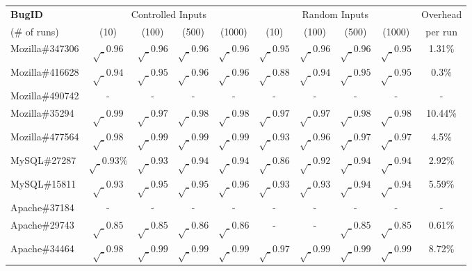 \begin{table}[h!]
  \centering
  \scriptsize
  \newcommand{\Yes}[1]{\checkmark{}$_#1$}
  \newcommand{\No}[0]{-}
  \begin{tabular}{lccccccccc}
    \toprule     
   {\bf BugID}                   &  \multicolumn{4}{c}{Controlled Inputs}            &     \multicolumn{4}{c}{Random Inputs}          & Overhead \\
                           
    \cmidrule(lr){2-5}
    \cmidrule(lr){6-9}
    (\# of runs)                 &  (10)     &   (100)    &    (500)    & (1000)     &  (10)     &   (100)    &    (500)    & (1000)   &   per run\\
    \midrule 

    Mozilla\#347306   & $\surd_{0.96}$ & $\surd_{0.96}$  & $\surd_{0.96}$ & $\surd_{0.96}$ & $\surd_{0.95}$ & $\surd_{0.96}$ & $\surd_{0.96}$ & $\surd_{0.95}$ &  1.31\% \\
    Mozilla\#416628   & $\surd_{0.94}$ & $\surd_{0.95}$  & $\surd_{0.96}$  & $\surd_{0.96}$ & $\surd_{0.88}$ & $\surd_{0.94}$ & $\surd_{0.95}$ & $\surd_{0.95}$ & 0.3\% \\
    Mozilla\#490742   &  -  & -  & - & - & - & - & - & - & - \\
    Mozilla\#35294    &  $\surd_{0.99}$  & $\surd_{0.97}$ & $\surd_{0.98}$ & $\surd_{0.98}$ & $\surd_{0.97}$ & $\surd_{0.97}$ & $\surd_{0.98}$ & $\surd_{0.98}$ & 10.44\% \\
    Mozilla\#477564   &  $\surd_{0.98}$  & $\surd_{0.99}$ & $\surd_{0.99}$ & $\surd_{0.99}$ & $\surd_{0.93}$ & $\surd_{0.96}$ & $\surd_{0.97}$ & $\surd_{0.97}$ & 4.5\% \\
    \midrule
    MySQL\#27287      &  $\surd_{0.93}$\%  & $\surd_{0.93}$ & $\surd_{0.94}$ & $\surd_{0.94}$ & $\surd_{0.86}$ & $\surd_{0.92}$ & $\surd_{0.94}$ & $\surd_{0.94}$& 2.92\% \\
    MySQL\#15811      &  $\surd_{0.93}$  & $\surd_{0.95}$ & $\surd_{0.95}$ & $\surd_{0.96}$ & $\surd_{0.93}$ & $\surd_{0.93}$ & $\surd_{0.94}$ & $\surd_{0.94}$ & 5.59\% \\
    \midrule
    Apache\#37184     &  -  & -  & - & - & - & - & - & - & - \\
    Apache\#29743     & $\surd_{0.85}$  & $\surd_{0.85}$ & $\surd_{0.86}$ & $\surd_{0.86}$ & - & - & $\surd_{0.85}$ & $\surd_{0.85}$ & 0.61\% \\
    Apache\#34464     & $\surd_{0.98}$  & $\surd_{0.99}$ & $\surd_{0.99}$ & $\surd_{0.99}$ & $\surd_{0.97}$ & $\surd_{0.99}$ & $\surd_{0.99}$ & $\surd_{0.99}$ & 8.72\% \\

\end{tabular}
\end{table}
